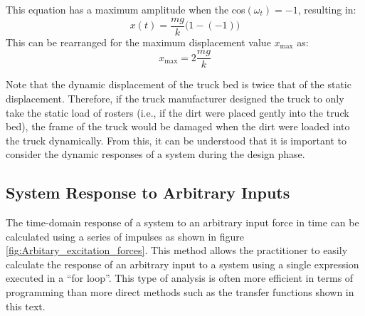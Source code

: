 \documentclass[12pt,letter]{article}
\begin{document}
\begin{example}
This equation has a maximum amplitude when the cos$(\omega_t)=-1$, resulting in:
\begin{equation}
	x(t) = \frac{m g}{k}\big(1-(-1)\big)
\end{equation}
This can be rearranged for the maximum displacement value $x_\text{max} $ as:
\begin{equation}
	x_\text{max} = 2\frac{m g}{k}
\end{equation} 

Note that the dynamic displacement of the truck bed is twice that of the static displacement. Therefore, if the truck manufacturer designed the truck to only take the static load of rosters (i.e., if the dirt were placed gently into the truck bed), the frame of the truck would be damaged when the dirt were loaded into the truck dynamically. From this, it can be understood that it is important to consider the dynamic responses of a system during the design phase.


\end{example}

\subsection{System Response to Arbitrary Inputs}

\label{sec:impulse_inputs}

The time-domain response of a system to an arbitrary input force in time can be calculated using a series of impulses as shown in figure \ref{fig:Arbitary_excitation_forces}. This method allows the practitioner to easily calculate the response of an arbitrary input to a system using a single expression executed in a ``for loop''. This type of analysis is often more efficient in terms of programming than more direct methods such as the transfer functions shown in this text. 
\end{document}
